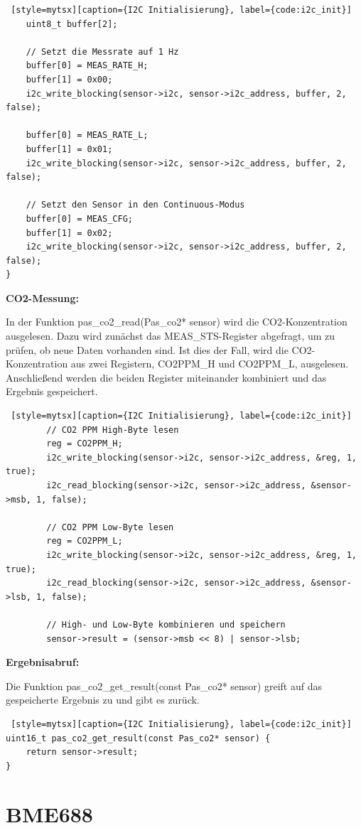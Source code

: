 \begin{inhalt}
\begin{lstlisting} [style=mytsx][caption={I2C Initialisierung}, label={code:i2c_init}]
    uint8_t buffer[2];

    // Setzt die Messrate auf 1 Hz
    buffer[0] = MEAS_RATE_H;
    buffer[1] = 0x00;
    i2c_write_blocking(sensor->i2c, sensor->i2c_address, buffer, 2, false);
    
    buffer[0] = MEAS_RATE_L;
    buffer[1] = 0x01;
    i2c_write_blocking(sensor->i2c, sensor->i2c_address, buffer, 2, false);

    // Setzt den Sensor in den Continuous-Modus
    buffer[0] = MEAS_CFG;
    buffer[1] = 0x02;
    i2c_write_blocking(sensor->i2c, sensor->i2c_address, buffer, 2, false);
}
\end{lstlisting}


\textbf{CO2-Messung:}

In der Funktion pas\_co2\_read(Pas\_co2* sensor) wird die CO2-Konzentration ausgelesen. Dazu wird zunächst das MEAS\_STS-Register abgefragt, um zu prüfen, ob neue Daten vorhanden sind. Ist dies der Fall, wird die CO2-Konzentration aus zwei Registern, CO2PPM\_H und CO2PPM\_L, ausgelesen. Anschließend werden die beiden Register miteinander kombiniert und das Ergebnis gespeichert.

\begin{lstlisting} [style=mytsx][caption={I2C Initialisierung}, label={code:i2c_init}]
        // CO2 PPM High-Byte lesen
        reg = CO2PPM_H;
        i2c_write_blocking(sensor->i2c, sensor->i2c_address, &reg, 1, true);
        i2c_read_blocking(sensor->i2c, sensor->i2c_address, &sensor->msb, 1, false);

        // CO2 PPM Low-Byte lesen
        reg = CO2PPM_L;
        i2c_write_blocking(sensor->i2c, sensor->i2c_address, &reg, 1, true);
        i2c_read_blocking(sensor->i2c, sensor->i2c_address, &sensor->lsb, 1, false);

        // High- und Low-Byte kombinieren und speichern
        sensor->result = (sensor->msb << 8) | sensor->lsb;
\end{lstlisting}


\textbf{Ergebnisabruf:}

Die Funktion pas\_co2\_get\_result(const Pas\_co2* sensor) greift auf das gespeicherte Ergebnis zu und gibt es zurück. 

\begin{lstlisting} [style=mytsx][caption={I2C Initialisierung}, label={code:i2c_init}]
uint16_t pas_co2_get_result(const Pas_co2* sensor) {
    return sensor->result;
}
\end{lstlisting}

\section{BME688}


\end{inhalt}
